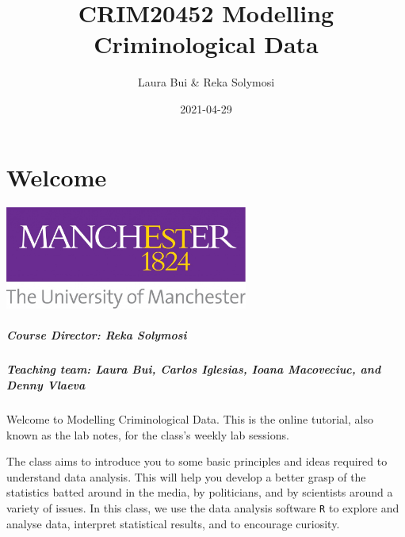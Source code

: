 \documentclass[
]{book}
\title{CRIM20452 Modelling Criminological Data}
\author{Laura Bui \& Reka Solymosi}
\date{2021-04-29}
\begin{document}
\maketitle

{
\setcounter{tocdepth}{1}
\tableofcontents
}
\hypertarget{welcome}{%
\chapter*{Welcome}\label{welcome}}

\includegraphics[width=0.6\textwidth,height=\textheight]{Images/UOM.jpg}

\hypertarget{course-director-reka-solymosi}{%
\paragraph*{Course Director: Reka Solymosi}\label{course-director-reka-solymosi}}

\hypertarget{teaching-team-laura-bui-carlos-iglesias-ioana-macoveciuc-and-denny-vlaeva}{%
\paragraph*{Teaching team: Laura Bui, Carlos Iglesias, Ioana Macoveciuc, and Denny Vlaeva}\label{teaching-team-laura-bui-carlos-iglesias-ioana-macoveciuc-and-denny-vlaeva}}

Welcome to Modelling Criminological Data. This is the online tutorial, also known as the lab notes, for the class's weekly lab sessions.

The class aims to introduce you to some basic principles and ideas required to understand data analysis. This will help you develop a better grasp of the statistics batted around in the media, by politicians, and by scientists around a variety of issues. In this class, we use the data analysis software \texttt{R} to explore and analyse data, interpret statistical results, and to encourage curiosity.
\end{document}
